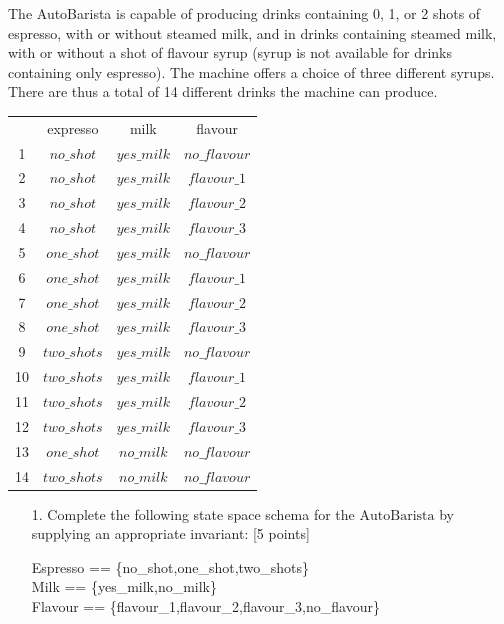 \documentclass[12pt,fleqn]{article}
\begin{document}
\begin{enumerate}
The AutoBarista is capable of producing drinks containing 0, 1, or 2 shots of espresso, with or without steamed milk, and in drinks containing steamed milk, with or without a shot of flavour syrup (syrup is not available for drinks containing only espresso). The machine offers a choice of three different syrups. There are thus a total of 14 different drinks the machine can produce. \\
\begin{center}
  \color{blue}
\begin{tabular}{ c c c c}
       & expresso & milk & flavour \\ 
 1     & $no\_shot$ & $yes\_milk$ & $no\_flavour$ \\  
 2     & $no\_shot$ & $yes\_milk$ & $flavour\_1$ \\
 3     & $no\_shot$ & $yes\_milk$ & $flavour\_2$ \\
 4     & $no\_shot$ & $yes\_milk$ & $flavour\_3$ \\
 5     & $one\_shot$ & $yes\_milk$ & $no\_flavour$ \\  
 6     & $one\_shot$ & $yes\_milk$ & $flavour\_1$ \\
 7     & $one\_shot$ & $yes\_milk$ & $flavour\_2$ \\
 8     & $one\_shot$ & $yes\_milk$ & $flavour\_3$ \\
 9     & $two\_shots$ & $yes\_milk$ & $no\_flavour$ \\  
 10    & $two\_shots$ & $yes\_milk$ & $flavour\_1$ \\
 11    & $two\_shots$ & $yes\_milk$ & $flavour\_2$ \\
 12    & $two\_shots$ & $yes\_milk$ & $flavour\_3$ \\
 13    & $one\_shot$ & $no\_milk$  & $no\_flavour$ \\
 14    & $two\_shots$ & $no\_milk$ & $no\_flavour$ \\
 \end{tabular}
\end{center}

\begin{enumerate}
\item[1.] Complete the following state space schema for the $\mathrm{AutoBarista}$ by supplying an appropriate invariant: [5 points]

\begin{zed}
Espresso == \{no\_shot,one\_shot,two\_shots\}\\
Milk == \{yes\_milk,no\_milk\}\\
Flavour == \{flavour\_1,flavour\_2,flavour\_3,no\_flavour\}
\end{zed}


\end{enumerate}
\end{enumerate}
\end{document}
